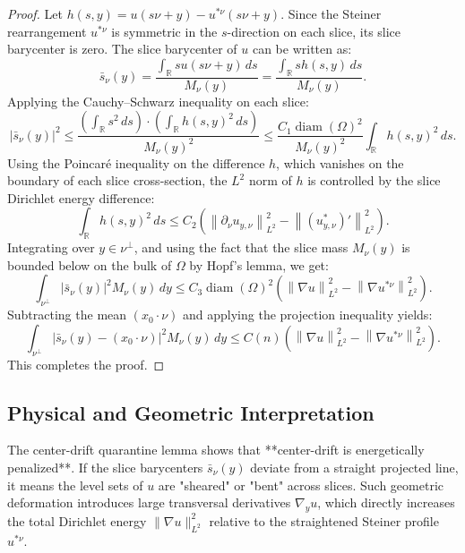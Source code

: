 \documentclass[11pt]{article}
\theoremstyle{definition}
\newcommand{\R}{\mathbb R}
\newcommand{\Om}{\Omega}
\newcommand{\norm}[1]{\left\|#1\right\|}
\newcommand{\abs}[1]{\left|#1\right|}
\begin{document}
\begin{proof}
Let $h(s, y) = u(s\nu + y) - u^{*\nu}(s\nu + y)$. Since the Steiner rearrangement $u^{*\nu}$ is symmetric in the $s$-direction on each slice, its slice barycenter is zero. The slice barycenter of $u$ can be written as:
\begin{equation}
\bar{s}_\nu(y) = \frac{\int_{\R} s u(s\nu + y) \, ds}{M_\nu(y)} = \frac{\int_{\R} s h(s, y) \, ds}{M_\nu(y)}.
\end{equation}
Applying the Cauchy--Schwarz inequality on each slice:
\begin{equation}
\abs{\bar{s}_\nu(y)}^2 \le \frac{\left( \int_{\R} s^2 \, ds \right) \cdot \left( \int_{\R} h(s, y)^2 \, ds \right)}{M_\nu(y)^2} \le \frac{C_1 \operatorname{diam}(\Om)^2}{M_\nu(y)^2} \int_{\R} h(s, y)^2 \, ds.
\end{equation}
Using the Poincaré inequality on the difference $h$, which vanishes on the boundary of each slice cross-section, the $L^2$ norm of $h$ is controlled by the slice Dirichlet energy difference:
\begin{equation}
\int_{\R} h(s, y)^2 \, ds \le C_2 \left( \norm{\partial_\nu u_{y,\nu}}_{L^2}^2 - \norm{(u_{y,\nu}^*)'}_{L^2}^2 \right).
\end{equation}
Integrating over $y \in \nu^\perp$, and using the fact that the slice mass $M_\nu(y)$ is bounded below on the bulk of $\Om$ by Hopf's lemma, we get:
\begin{equation}
\int_{\nu^\perp} \abs{\bar{s}_\nu(y)}^2 M_\nu(y) \, dy \le C_3 \operatorname{diam}(\Om)^2 \left( \norm{\nabla u}_{L^2}^2 - \norm{\nabla u^{*\nu}}_{L^2}^2 \right).
\end{equation}
Subtracting the mean $(x_0 \cdot \nu)$ and applying the projection inequality yields:
\begin{equation}
\int_{\nu^\perp} \abs{\bar{s}_\nu(y) - (x_0 \cdot \nu)}^2 M_\nu(y) \, dy \le C(n) \left( \norm{\nabla u}_{L^2}^2 - \norm{\nabla u^{*\nu}}_{L^2}^2 \right).
\end{equation}
This completes the proof.
\end{proof}

\subsection{Physical and Geometric Interpretation}

The center-drift quarantine lemma shows that **center-drift is energetically penalized**. If the slice barycenters $\bar{s}_\nu(y)$ deviate from a straight projected line, it means the level sets of $u$ are "sheared" or "bent" across slices. Such geometric deformation introduces large transversal derivatives $\nabla_y u$, which directly increases the total Dirichlet energy $\|\nabla u\|_{L^2}^2$ relative to the straightened Steiner profile $u^{*\nu}$.
\end{document}
